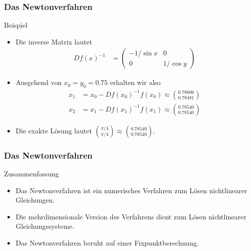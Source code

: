 \documentclass{beamer}
\renewcommand{\oe}{\"o}
\newcommand{\mytitle}{Das Newtonverfahren}
\begin{document}
\begin{frame}\frametitle{\mytitle}
	\begin{block}{Beispiel}
		\begin{itemize}
			\item Die inverse Matrix lautet
				\begin{align*}
					Df(x)^{-1}&=\begin{pmatrix} -1/\sin x&0\\0&1/\cos y \end{pmatrix}
				\end{align*}
			\item Ausgehend von $x_0=y_0=0.75$ erhalten wir also
				\begin{align*}
					x_1&=x_0-Df(x_0)^{-1}f(x_0)\approx\binom{0.78606}{0.78481}\\
					x_2&=x_1-Df(x_1)^{-1}f(x_1)\approx\binom{0.78540}{0.78540}
				\end{align*}
			\item Die exakte L\oe sung lautet $\binom{\pi/4}{\pi/4}\approx\binom{0.78540}{0.78540}.$
		\end{itemize}
	\end{block}
\end{frame}

\begin{frame}\frametitle{\mytitle}
	\begin{block}{Zusammenfassung}
		\begin{itemize}
			\item Das Newtonverfahren ist ein numerisches Verfahren zum L\oe sen nichtlinearer Gleichungen.
			\item Die mehrdimensionale Version des Verfahrens dient zum L\oe sen nichtlinearer Gleichungssysteme.
			\item Das Newtonverfahren beruht auf einer Fixpunktberechnung.
		\end{itemize}
	\end{block}
\end{frame}
\end{document}

